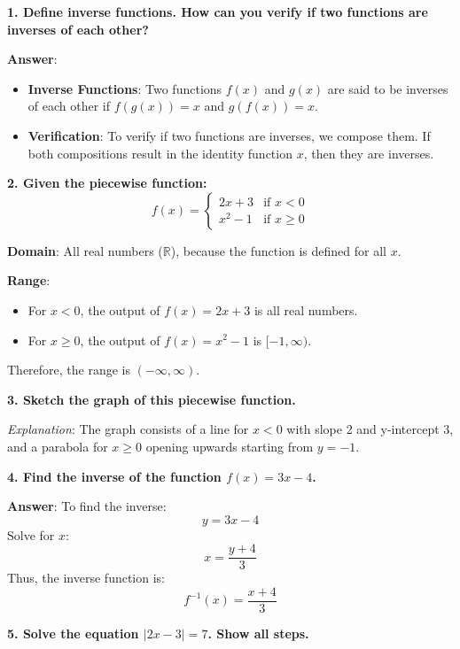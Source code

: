\documentclass{article}
\begin{document}
\textbf{1. Define inverse functions. How can you verify if two functions are inverses of each other?}

\textbf{Answer}: 
\begin{itemize}
    \item \textbf{Inverse Functions}: Two functions \( f(x) \) and \( g(x) \) are said to be inverses of each other if \( f(g(x)) = x \) and \( g(f(x)) = x \).
    \item \textbf{Verification}: To verify if two functions are inverses, we compose them. If both compositions result in the identity function \( x \), then they are inverses.
\end{itemize}

\bigskip

\textbf{2. Given the piecewise function:}
\[
f(x) = 
\begin{cases} 
2x + 3 & \text{if } x < 0 \\
x^2 - 1 & \text{if } x \geq 0
\end{cases}
\]

\textbf{Domain}: All real numbers (\( \mathbb{R} \)), because the function is defined for all \( x \).

\textbf{Range}: 
\begin{itemize}
    \item For \( x < 0 \), the output of \( f(x) = 2x + 3 \) is all real numbers.
    \item For \( x \geq 0 \), the output of \( f(x) = x^2 - 1 \) is \( [-1, \infty) \).
\end{itemize}

Therefore, the range is \( (-\infty, \infty) \).

\bigskip

\textbf{3. Sketch the graph of this piecewise function.}

\textit{Explanation}: The graph consists of a line for \( x < 0 \) with slope 2 and y-intercept 3, and a parabola for \( x \geq 0 \) opening upwards starting from \( y = -1 \).

\bigskip

\textbf{4. Find the inverse of the function \( f(x) = 3x - 4 \).}

\textbf{Answer}: 
To find the inverse:
\[
y = 3x - 4
\]
Solve for \( x \):
\[
x = \frac{y + 4}{3}
\]
Thus, the inverse function is:
\[
f^{-1}(x) = \frac{x + 4}{3}
\]

\bigskip

\textbf{5. Solve the equation \( |2x - 3| = 7 \). Show all steps.}
\end{document}
